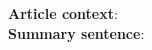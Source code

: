 \begin{example}
\begin{mdframed}
\textbf{Article context}:  \\
\textbf{Summary sentence}: 
\end{mdframed}
\caption{}
\end{example}